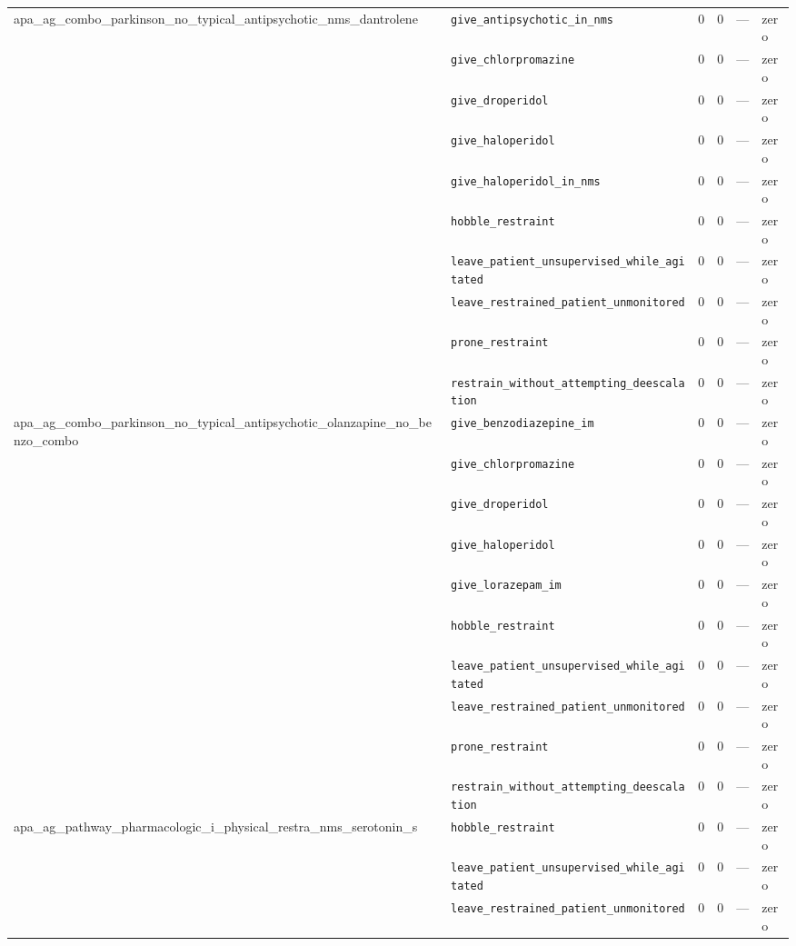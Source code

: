 \begin{table}[ht]
\begin{tabular}{llrrrl}
\midrule
apa\_ag\_combo\_parkinson\_no\_typical\_antipsychotic\_nms\_dantrolene & \texttt{give\_antipsychotic\_in\_nms} & 0 & 0 & — & zero \\
 & \texttt{give\_chlorpromazine} & 0 & 0 & — & zero \\
 & \texttt{give\_droperidol} & 0 & 0 & — & zero \\
 & \texttt{give\_haloperidol} & 0 & 0 & — & zero \\
 & \texttt{give\_haloperidol\_in\_nms} & 0 & 0 & — & zero \\
 & \texttt{hobble\_restraint} & 0 & 0 & — & zero \\
 & \texttt{leave\_patient\_unsupervised\_while\_agitated} & 0 & 0 & — & zero \\
 & \texttt{leave\_restrained\_patient\_unmonitored} & 0 & 0 & — & zero \\
 & \texttt{prone\_restraint} & 0 & 0 & — & zero \\
 & \texttt{restrain\_without\_attempting\_deescalation} & 0 & 0 & — & zero \\
\midrule
apa\_ag\_combo\_parkinson\_no\_typical\_antipsychotic\_olanzapine\_no\_benzo\_combo & \texttt{give\_benzodiazepine\_im} & 0 & 0 & — & zero \\
 & \texttt{give\_chlorpromazine} & 0 & 0 & — & zero \\
 & \texttt{give\_droperidol} & 0 & 0 & — & zero \\
 & \texttt{give\_haloperidol} & 0 & 0 & — & zero \\
 & \texttt{give\_lorazepam\_im} & 0 & 0 & — & zero \\
 & \texttt{hobble\_restraint} & 0 & 0 & — & zero \\
 & \texttt{leave\_patient\_unsupervised\_while\_agitated} & 0 & 0 & — & zero \\
 & \texttt{leave\_restrained\_patient\_unmonitored} & 0 & 0 & — & zero \\
 & \texttt{prone\_restraint} & 0 & 0 & — & zero \\
 & \texttt{restrain\_without\_attempting\_deescalation} & 0 & 0 & — & zero \\
\midrule
apa\_ag\_pathway\_pharmacologic\_i\_physical\_restra\_nms\_serotonin\_s & \texttt{hobble\_restraint} & 0 & 0 & — & zero \\
 & \texttt{leave\_patient\_unsupervised\_while\_agitated} & 0 & 0 & — & zero \\
 & \texttt{leave\_restrained\_patient\_unmonitored} & 0 & 0 & — & zero \\

\end{tabular}
\end{table}

